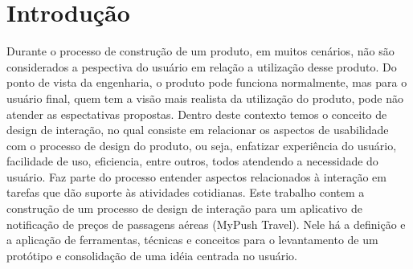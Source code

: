 \chapter[Introdução]{Introdução}
	
	Durante o processo de construção de um produto, em muitos cenários, não são considerados a pespectiva do usuário em relação a utilização desse produto. Do ponto de vista da engenharia, o produto pode funciona normalmente, mas para o usuário final, quem tem a visão mais realista da utilização do produto, pode não atender as espectativas propostas.
	Dentro deste contexto temos o conceito de design de interação, no qual consiste em relacionar os aspectos de usabilidade com o processo de design do produto, ou seja, enfatizar experiência do usuário, facilidade de uso, eficiencia, entre outros, todos atendendo a necessidade do usuário. Faz parte do processo entender aspectos relacionados à interação em tarefas que dão suporte às atividades cotidianas.
	Este trabalho contem a construção de um processo de design de interação para um aplicativo de notificação de preços de passagens aéreas (MyPush Travel). Nele há a definição e a aplicação de ferramentas, técnicas e conceitos para o levantamento de um protótipo e consolidação de uma idéia centrada no usuário.
